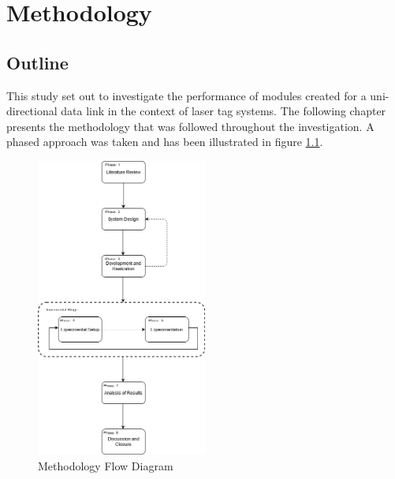 \chapter{Methodology}
\label{ch_methodology}






\section{Outline}

This study set out to investigate the performance of modules created for a uni-directional data link in the context of laser tag systems. The following chapter presents the methodology that was followed throughout the investigation. A phased approach was taken and has been illustrated in figure \ref{fig:methodology_overview}.

\begin{figure}[H]
	\centering
	\includegraphics[width=0.5\textwidth]{figures/methodology/methodology}
	\caption{Methodology Flow Diagram}
	\label{fig:methodology_overview}
\end{figure}

